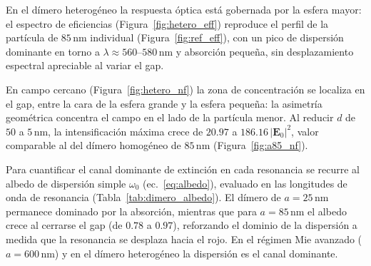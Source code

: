 En el dímero heterogéneo la respuesta óptica está gobernada por la esfera
mayor: el espectro de eficiencias (Figura~\ref{fig:hetero_eff}) reproduce el
perfil de la partícula de $85\,\text{nm}$ individual
(Figura~\ref{fig:ref_eff}), con un pico de dispersión dominante en torno a
$\lambda\approx560$--$580\,\text{nm}$ y absorción pequeña, sin desplazamiento
espectral apreciable al variar el gap.

En campo cercano (Figura~\ref{fig:hetero_nf}) la zona de concentración se
localiza en el gap, entre la cara de la esfera grande y la esfera pequeña: la
asimetría geométrica concentra el campo en el lado de la partícula menor. Al
reducir $d$ de $50$ a $5\,\text{nm}$, la intensificación máxima crece de
$20.97$ a $186.16\,|\mathbf{E}_0|^2$, valor comparable al del dímero homogéneo
de $85\,\text{nm}$ (Figura~\ref{fig:a85_nf}).

Para cuantificar el canal dominante de extinción
en cada resonancia se recurre al albedo de dispersión simple $\omega_0$ (ec.~\ref{eq:albedo}),
evaluado en las longitudes de onda de resonancia
(Tabla~\ref{tab:dimero_albedo}). El dímero de $a=25\,\text{nm}$ permanece
dominado por la absorción, mientras que para $a=85\,\text{nm}$ el albedo crece
al cerrarse el gap (de $0.78$ a $0.97$), reforzando el dominio de la dispersión
a medida que la resonancia se desplaza hacia el rojo. En el régimen Mie avanzado
($a=600\,\text{nm}$) y en el dímero heterogéneo la dispersión es el canal
dominante.


